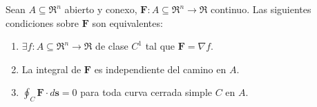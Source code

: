 \begin{theorem}
    Sean $A\subseteq\Re^n$ abierto y conexo, $\mathbf{F}:A\subseteq\Re^n\to\Re$ continuo. Las siguientes condiciones sobre $\mathbf{F}$ son equivalentes:
    \begin{enumerate}
        \item $\exists f:A\subseteq\Re^n\to\Re$ de clase $C^1$ tal que $\mathbf{F}=\nabla f.$ 
        \item La integral de $\mathbf{F}$ es independiente del camino en $A$.
        \item $\oint_C\mathbf{F}\cdot d\mathbf{s}=0$ para toda curva cerrada simple $C$ en $A$.\final
    \end{enumerate}
\end{theorem}